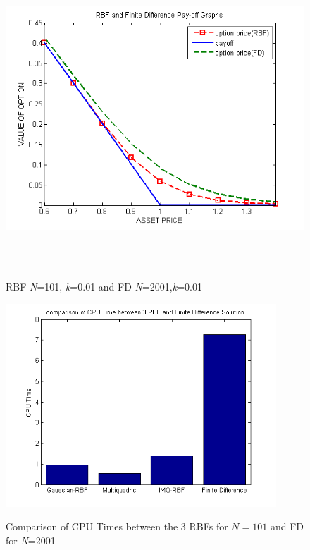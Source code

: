 \documentclass[12pt]{article}
\numberwithin{equation}{section} %
\begin{document}
\newpage
\begin{figure}
\begin{centering}
\includegraphics[height=4in]{rbffd101.png}\ \caption{RBF \textit{N}=101, \textit{k}=0.01 and FD
\textit{N}=2001,\textit{k}=0.01 }
 \vskip -0.5in

\end{centering}
\end{figure}

 \begin{figure}[h]
\begin{centering}
\includegraphics[height=3in]{cpue10000.png}\
\caption{Comparison of CPU Times between the 3 RBFs for $N=101$ and
FD for \textit{N}=2001 } \vskip -0.5in
\end{centering}
\end{figure}
\end{document}
